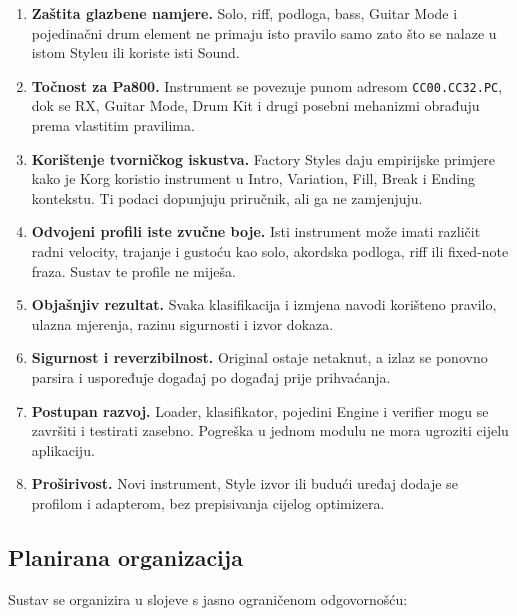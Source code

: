 \documentclass[11pt]{article}
\begin{document}
\begin{enumerate}[label=B\arabic*.]
    \item \textbf{Zaštita glazbene namjere.} Solo, riff, podloga, bass, Guitar
    Mode i pojedinačni drum element ne primaju isto pravilo samo zato što se
    nalaze u istom Styleu ili koriste isti Sound.

    \item \textbf{Točnost za Pa800.} Instrument se povezuje punom adresom
    \texttt{CC00.CC32.PC}, dok se RX, Guitar Mode, Drum Kit i drugi posebni
    mehanizmi obrađuju prema vlastitim pravilima.

    \item \textbf{Korištenje tvorničkog iskustva.} Factory Styles daju
    empirijske primjere kako je Korg koristio instrument u Intro, Variation,
    Fill, Break i Ending kontekstu. Ti podaci dopunjuju priručnik, ali ga ne
    zamjenjuju.

    \item \textbf{Odvojeni profili iste zvučne boje.} Isti instrument može
    imati različit radni velocity, trajanje i gustoću kao solo, akordska
    podloga, riff ili fixed-note fraza. Sustav te profile ne miješa.

    \item \textbf{Objašnjiv rezultat.} Svaka klasifikacija i izmjena navodi
    korišteno pravilo, ulazna mjerenja, razinu sigurnosti i izvor dokaza.

    \item \textbf{Sigurnost i reverzibilnost.} Original ostaje netaknut, a
    izlaz se ponovno parsira i uspoređuje događaj po događaj prije prihvaćanja.

    \item \textbf{Postupan razvoj.} Loader, klasifikator, pojedini Engine i
    verifier mogu se završiti i testirati zasebno. Pogreška u jednom modulu ne
    mora ugroziti cijelu aplikaciju.

    \item \textbf{Proširivost.} Novi instrument, Style izvor ili budući uređaj
    dodaje se profilom i adapterom, bez prepisivanja cijelog optimizera.
\end{enumerate}

\subsection{Planirana organizacija}

Sustav se organizira u slojeve s jasno ograničenom odgovornošću:
\end{document}
